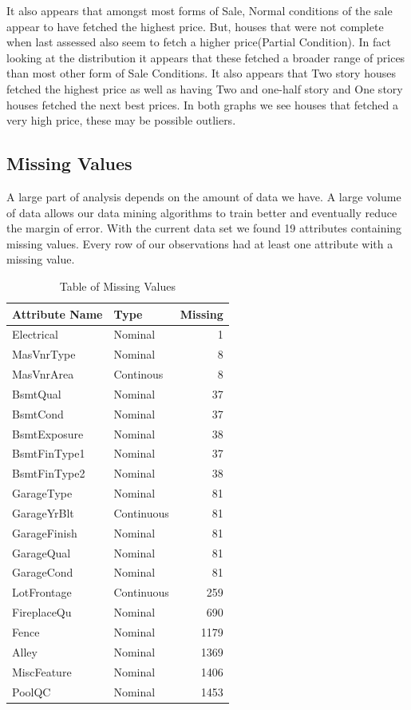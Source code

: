 \documentclass[fleqn,10pt]{SelfArx} %
\begin{document}
	It also appears that amongst most forms of Sale, Normal conditions of the sale appear to have fetched the highest price. But, houses that were not complete when last assessed also seem to fetch a higher price(Partial Condition). In fact looking at the distribution it appears that these fetched a broader range of prices than most other form of Sale Conditions. It also appears that Two story houses fetched the highest price as well as having Two and one-half story and One story houses fetched the next best prices. In both graphs we see houses that fetched a very high price, these may be possible outliers. 
	
	\subsection{Missing Values}
	A large part of analysis depends on the amount of data we have. A large volume of data allows our  data mining algorithms to train better and eventually reduce the margin of error. With the current data set we found 19 attributes containing missing values. Every row of our observations had at least one attribute with a missing value. 
	
	\begin{table}[hbt]
		\caption{Table of Missing Values}
		\centering
		\begin{tabular}{llr}
			\cmidrule(r){1-2}
			Attribute Name &  Type & Missing \\
			\midrule
			Electrical & Nominal & 1 \\
			MasVnrType & Nominal & 8 \\
			MasVnrArea & Continous & 8 \\
			BsmtQual & Nominal & 37 \\
			BsmtCond & Nominal & 37 \\
			BsmtExposure & Nominal & 38 \\
			BsmtFinType1 & Nominal & 37 \\
			BsmtFinType2 & Nominal & 38 \\
			GarageType & Nominal & 81 \\
			GarageYrBlt & Continuous & 81 \\ 
			GarageFinish & Nominal & 81 \\
			GarageQual & Nominal & 81 \\
			GarageCond & Nominal & 81 \\
			LotFrontage & Continuous & 259 \\
			FireplaceQu & Nominal & 690 \\
			Fence & Nominal & 1179 \\
			Alley & Nominal & 1369 \\
			MiscFeature & Nominal & 1406 \\
			PoolQC & Nominal & 1453 \\	
		\end{tabular}
		\label{tab:label}
	\end{table}
\end{document}
